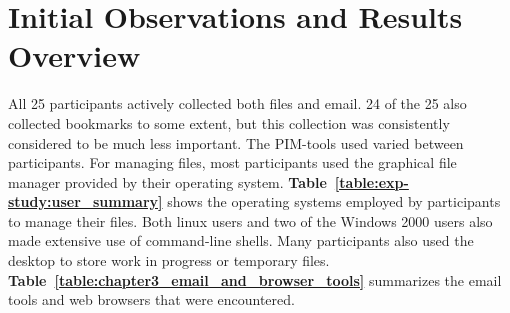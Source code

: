 \newpage
\section{Initial Observations and Results Overview}
\label{exp-study:results-overview}

All 25 participants actively collected both files and email. 24 of the 25 also collected bookmarks to some extent, but this collection was consistently considered to be much less important. The PIM-tools used varied between participants. For managing files, most participants used the graphical file manager provided by their operating system.  \textbf{Table~\ref{table:exp-study:user_summary}} shows the operating systems employed by participants to manage their files.  Both linux users and two of the Windows 2000 users also made extensive use of command-line shells.  Many participants also used the desktop to store work in progress or temporary files. \textbf{Table~\ref{table:chapter3_email_and_browser_tools}} summarizes the email tools and web browsers that were encountered.

